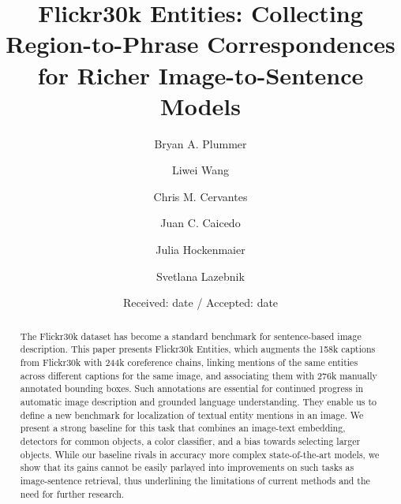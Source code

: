 \documentclass[twocolumn]{svjour3}
\begin{document}
\title{Flickr30k Entities: Collecting Region-to-Phrase Correspondences for Richer Image-to-Sentence Models}





\author{Bryan A. Plummer         
\and
Liwei Wang
\and 
Chris M. Cervantes
\and 
Juan C. Caicedo
\and 
Julia Hockenmaier
\and 
Svetlana Lazebnik
}




\date{Received: date / Accepted: date}



\maketitle


\begin{abstract}
The Flickr30k dataset has become a standard benchmark for sentence-based image description. This paper presents Flickr30k Entities, which augments the 158k captions from Flickr30k with 244k coreference chains, linking mentions of the same entities across different captions for the same image, and associating them with 276k manually annotated bounding boxes. Such annotations are essential for continued progress in automatic image description and grounded language understanding. They enable us to define a new benchmark for localization of textual entity mentions in an image.  We present a strong baseline for this task that combines an image-text embedding, detectors for common objects, a color classifier, and a bias towards selecting larger objects. While our baseline rivals in accuracy more complex state-of-the-art models, we show that its gains cannot be easily parlayed into improvements on such tasks as image-sentence retrieval, thus underlining the limitations of current methods and the need for further research.
\end{abstract}
\end{document}

